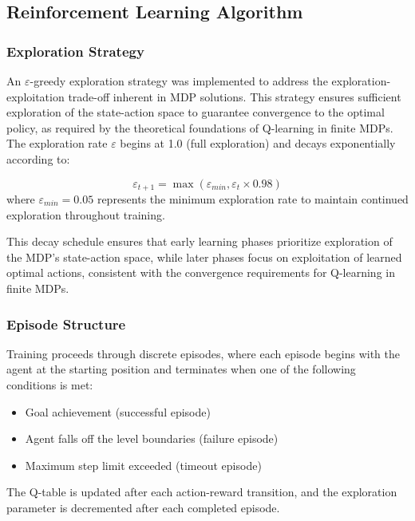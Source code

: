 \subsection{Reinforcement Learning Algorithm}

\subsubsection{Exploration Strategy}
An $\varepsilon$-greedy exploration strategy was implemented to address the exploration-exploitation trade-off inherent in MDP solutions. This strategy ensures sufficient exploration of the state-action space to guarantee convergence to the optimal policy, as required by the theoretical foundations of Q-learning in finite MDPs. The exploration rate $\varepsilon$ begins at 1.0 (full exploration) and decays exponentially according to:

\begin{equation}
\varepsilon_{t+1} = \max(\varepsilon_{min}, \varepsilon_t \times 0.98)
\end{equation}
where $\varepsilon_{min} = 0.05$ represents the minimum exploration rate to maintain continued exploration throughout training.

This decay schedule ensures that early learning phases prioritize exploration of the MDP's state-action space, while later phases focus on exploitation of learned optimal actions, consistent with the convergence requirements for Q-learning in finite MDPs.

\subsubsection{Episode Structure}
Training proceeds through discrete episodes, where each episode begins with the agent at the starting position and terminates when one of the following conditions is met:
\begin{itemize}
    \item Goal achievement (successful episode)
    \item Agent falls off the level boundaries (failure episode)  
    \item Maximum step limit exceeded (timeout episode)
\end{itemize}

The Q-table is updated after each action-reward transition, and the exploration parameter is decremented after each completed episode.

